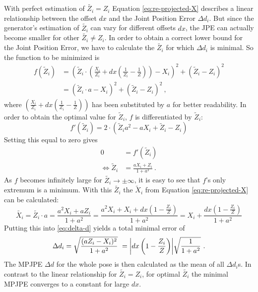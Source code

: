 With perfect estimation of $\widetilde{Z_i} = Z_i$ Equation \eqref{eq:re-projected-X} describes a linear relationship between the offset $dx$ and the Joint Position Error $\Delta d_i$.
But since the generator's estimation of $\widetilde{Z_i}$ can vary for different offsets $dx$, the JPE can actually become smaller for other $\widetilde{Z_i} \neq Z_i$. 
In order to obtain a correct lower bound for the Joint Position Error, we have to calculate the $\widetilde{Z_i}$ for which $\Delta d_i$ is minimal.
So the function to be minimized is
\begin{align}
	\label{eq:minimum-distance}
	f(\widetilde{Z}_i) &= \left ( \widetilde{Z}_i \cdot \left( \frac{X_i}{Z_i} + dx \left( \frac{1}{Z_i} - \frac{1}{Z} \right) \right ) - X_i \right)^2 + ( \widetilde{Z}_i - Z_i ) ^2 \\
	&= \left ( \widetilde{Z}_i \cdot a - X_i \right)^2 + ( \widetilde{Z}_i - Z_i )^2 \ ,
\end{align}
where $\left( \frac{X_i}{Z_i} + dx \left( \frac{1}{Z_i} - \frac{1}{Z} \right) \right )$ has been substituted by $a$ for better readability.
In order to obtain the optimal value for $\widetilde{Z}_i$, $f$ is differentiated by $\widetilde{Z}_i$:
\begin{equation}
	\label{eq:derivative-minimum-distance}
	f'(\widetilde{Z}_i) = 2 \cdot (\widetilde{Z}_i a^2 - a X_i + \widetilde{Z}_i - Z_i)
\end{equation}
Setting this equal to zero gives
\begin{align}
	0 &= f'(\widetilde{Z}_i) \\
	\Leftrightarrow \widetilde{Z}_i & = \frac{a X_i + Z_i}{1 + a^2} \ .
	\label{eq:z_i-min}
\end{align}
As $f$ becomes infinitely large for $\widetilde{Z_i} \rightarrow \pm \infty$, it is easy to see that $f$'s only extremum is a minimum.
With this $\widetilde{Z_i}$ the $\widetilde{X}_i$ from Equation \eqref{eq:re-projected-X} can be calculated:
\begin{equation}
	\widetilde{X_i} 
	= \widetilde{Z_i} \cdot a
	=  \frac{a^2 X_i + a Z_i}{1 + a^2} = \frac{a^2 X_i + X_i + dx \left (1 - \frac{Z_i}{Z} \right )}{1 + a^2}
	= X_i + \frac{dx \left (1 - \frac{Z_i}{Z}\right )}{1 + a^2}
\end{equation}
Putting this into \eqref{eq:delta-d} yields a total minimal error of 
\begin{equation}
	\label{eq:minimum-delta-d}
	\Delta d_i = \sqrt{\frac{(a Z_i - X_i)^2}{1 + a^2}}\
	= \abs{dx \left (1 -  \frac{Z_i}{Z} \right )} \sqrt{\frac{1}{1 + a^2}} \ .
\end{equation}
The MPJPE $\Delta d$ for the whole pose is then calculated as the mean of all $\Delta d_i$s.
In contrast to the linear relationship for $\widetilde{Z_i} = Z_i$, for optimal $\widetilde{Z_i}$ the minimal MPJPE converges to a constant for large $dx$.

